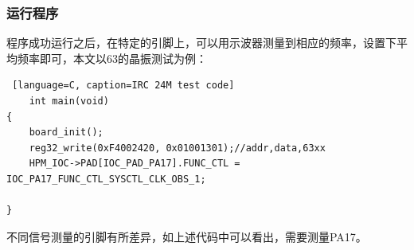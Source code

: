 \subsubsection{运行程序}
程序成功运行之后，在特定的引脚上，可以用示波器测量到相应的频率，设置下平均频率即可，本文以63的晶振测试为例：\par
 \begin{lstlisting} [language=C, caption=IRC 24M test code]
	int main(void)
{
    board_init();
	reg32_write(0xF4002420, 0x01001301);//addr,data,63xx
	HPM_IOC->PAD[IOC_PAD_PA17].FUNC_CTL = IOC_PA17_FUNC_CTL_SYSCTL_CLK_OBS_1;

}
	 \end{lstlisting}

不同信号测量的引脚有所差异，如上述代码中可以看出，需要测量PA17。\par